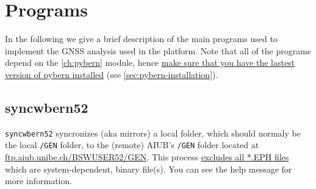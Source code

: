 \chapter{Programs}
\label{ch:programs}

In the following we give a brief description of the main programs used to 
implement the GNSS analysis used in the platform. Note that all of the programs 
depend on the \ref{ch:pybern} module, hence \underline{make sure that you have 
the lastest version of pybern installed} (see \ref{sec:pybern-installation}).

\section{syncwbern52}
\label{sec:programs-syncwbern52}
\verb|syncwbern52| syncronizes (aka mirrors) a local folder, which should normaly 
be the local \verb|/GEN| folder, to the (remote) AIUB's \verb|/GEN| folder 
located at \url{ftp.aiub.unibe.ch/BSWUSER52/GEN}. This process 
\underline{excludes all *.EPH files} which are system-dependent, binary file(s).
You can see the help message for more information.
